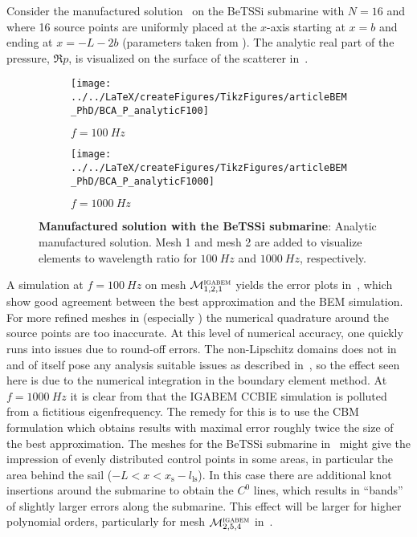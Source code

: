 Consider the manufactured solution~ on the BeTSSi submarine with $N=16$ and where 16 source points are uniformly placed at the $x$-axis starting at $x=b$ and ending at $x=-L-2b$ (parameters taken from ). The analytic real part of the pressure, $\Re{p}$, is visualized on the surface of the scatterer in~. 
\begin{figure}
	\centering
	\begin{subfigure}[t]{\textwidth}
		\texttt{[image: ../../LaTeX/createFigures/TikzFigures/articleBEM\_PhD/BCA\_P\_analyticF100]}
		\caption{$f=\SI{100}{Hz}$}
	\end{subfigure} 
	\par\bigskip
	\begin{subfigure}[t]{\textwidth}
		\texttt{[image: ../../LaTeX/createFigures/TikzFigures/articleBEM\_PhD/BCA\_P\_analyticF1000]}
		\caption{$f=\SI{1000}{Hz}$}
	\end{subfigure} 
	\caption{\textbf{Manufactured solution with the BeTSSi submarine}: Analytic manufactured solution. Mesh 1 and mesh 2 are added to visualize elements to wavelength ratio for $\SI{100}{Hz}$ and $\SI{1000}{Hz}$, respectively.}
	\label{Fig3:BCA_P_analytic}
\end{figure}
A simulation at $f=\SI{100}{Hz}$ on mesh ${\cal M}_{1,2,1}^{\textsc{igabem}}$ yields the error plots in~, which show good agreement between the best approximation and the BEM simulation. For more refined meshes in  (especially ) the numerical quadrature around the source points are too inaccurate. At this level of numerical accuracy, one quickly runs into issues due to round-off errors. The non-Lipschitz domains does not in and of itself pose any analysis suitable issues as described in~, so the effect seen here is due to the numerical integration in the boundary element method. At $f=\SI{1000}{Hz}$ it is clear from  that the IGABEM CCBIE simulation is polluted from a fictitious eigenfrequency. The remedy for this is to use the CBM formulation which obtains results with maximal error roughly twice the size of the best approximation. The meshes for the BeTSSi submarine in~ might give the impression of evenly distributed control points in some areas, in particular the area behind the sail ($-L<x<x_{\mathrm{s}}-l_{\mathrm{ls}}$). In this case there are additional knot insertions around the submarine to obtain the $C^0$ lines, which results in ``bands'' of slightly larger errors along the submarine. This effect will be larger for higher polynomial orders, particularly for mesh ${\cal M}_{2,5,4}^{\textsc{igabem}}$ in~.
